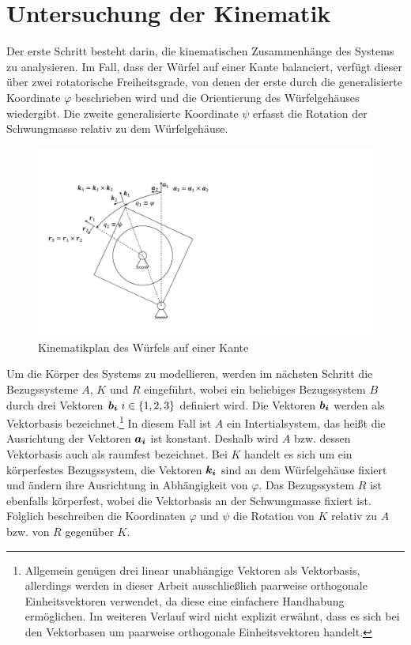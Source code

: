 \section{Untersuchung der Kinematik}
Der erste Schritt besteht darin, die kinematischen Zusammenhänge des Systems zu analysieren. Im Fall, dass der Würfel auf einer Kante balanciert, verfügt dieser über zwei rotatorische Freiheitsgrade, von denen der erste durch die generalisierte Koordinate $\varphi$ beschrieben wird und die Orientierung des Würfelgehäuses wiedergibt. Die zweite generalisierte Koordinate $\psi$ erfasst die Rotation der Schwungmasse relativ zu dem Würfelgehäuse.
\begin{figure}[!ht]
\centering
\includegraphics[width=0.6\linewidth, trim={1cm 1.5cm 16.5cm 3.5cm}, clip]{img/ModellWuerfelseite}
\caption{Kinematikplan des Würfels auf einer Kante}
\label{skizze_dynamik_edge}
\end{figure}

Um die Körper des Systems zu modellieren, werden im nächsten Schritt die Bezugssysteme $A$, $K$ und $R$ eingeführt, wobei ein beliebiges Bezugssystem $B$ durch drei Vektoren $\boldsymbol{b_i} \ i \in \{1,2,3\}$ definiert wird. Die Vektoren $\boldsymbol{b_i}$ werden als Vektorbasis bezeichnet.\footnote{Allgemein genügen drei linear unabhängige Vektoren als Vektorbasis, allerdings werden in dieser Arbeit ausschließlich paarweise orthogonale Einheitsvektoren verwendet, da diese eine einfachere Handhabung ermöglichen. Im weiteren Verlauf wird nicht explizit erwähnt, dass es sich bei den Vektorbasen um paarweise orthogonale Einheitsvektoren handelt.} In diesem Fall ist $A$ ein Intertialsystem, das heißt die Ausrichtung der Vektoren $\boldsymbol{a_i}$ ist konstant. Deshalb wird $A$ bzw. dessen Vektorbasis auch als raumfest bezeichnet. Bei $K$ handelt es sich um ein körperfestes Bezugssystem, die Vektoren $\boldsymbol{k_i}$ sind an dem Würfelgehäuse fixiert und ändern ihre Ausrichtung in Abhängigkeit von $\varphi$. Das Bezugssystem $R$ ist ebenfalls körperfest, wobei die Vektorbasis an der Schwungmasse fixiert ist. Folglich beschreiben die Koordinaten $\varphi$ und $\psi$ die Rotation von $K$ relativ zu $A$ bzw. von $R$ gegenüber $K$. 

